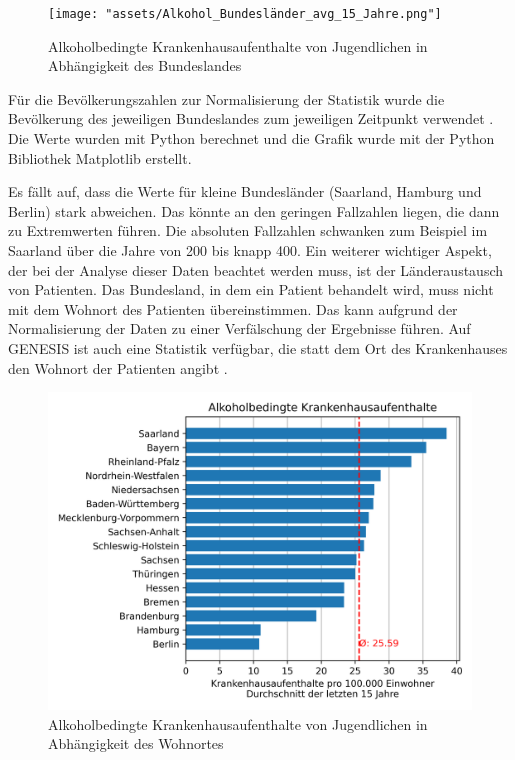 \documentclass[12pt]{article}
\begin{document}
\begin{figure}[H]
    \centering
    \texttt{[image: "assets/Alkohol\_Bundesländer\_avg\_15\_Jahre.png"]}
    \caption{Alkoholbedingte Krankenhausaufenthalte von Jugendlichen in Abhängigkeit des Bundeslandes}
    \label{fig:Krankenhausaufenthalte_1}
\end{figure}

Für die Bevölkerungszahlen zur Normalisierung der Statistik wurde die Bevölkerung des jeweiligen Bundeslandes zum jeweiligen Zeitpunkt verwendet \autocite{noauthor_statistisches_2024}. Die Werte wurden mit Python berechnet und die Grafik wurde mit der Python Bibliothek Matplotlib \autocite{noauthor_matplotlib_nodate} erstellt. 

Es fällt auf, dass die Werte für kleine Bundesländer (Saarland, Hamburg und Berlin) stark abweichen. Das könnte an den geringen Fallzahlen liegen, die dann zu Extremwerten führen. Die absoluten Fallzahlen schwanken zum Beispiel im Saarland über die Jahre von 200 bis knapp 400. Ein weiterer wichtiger Aspekt, der bei der Analyse dieser Daten beachtet werden muss, ist der Länderaustausch von Patienten. Das Bundesland, in dem ein Patient behandelt wird, muss nicht mit dem Wohnort des Patienten übereinstimmen. Das kann aufgrund der Normalisierung der Daten zu einer Verfälschung der Ergebnisse führen. Auf GENESIS ist auch eine Statistik verfügbar, die statt dem Ort des Krankenhauses den Wohnort der Patienten angibt \autocite{noauthor_genesis_nodate-1}.

\begin{figure}[H]
    \centering
    \includegraphics[scale=.7]{"assets/Alkohol_Wohnort_avg_15_Jahre.png"}
    \caption{Alkoholbedingte Krankenhausaufenthalte von Jugendlichen in Abhängigkeit des Wohnortes}
    \label{fig:Krankenhausaufenthalte_2}
\end{figure}
\end{document}
